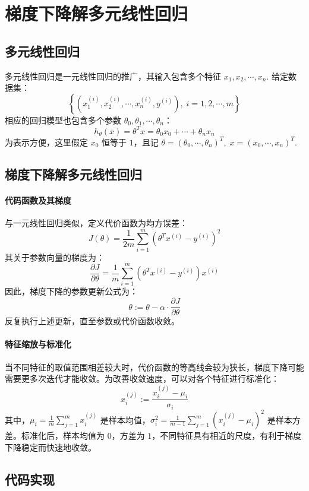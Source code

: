 \section{梯度下降解多元线性回归}
\label{sec:chapter2}

\subsection{多元线性回归}

多元线性回归是一元线性回归的推广，其输入包含多个特征 $x_1,x_2,\cdots,x_n$. 给定数据集：
\[
\left\{\left(x_1^{(i)},x_2^{(i)},\cdots,x_n^{(i)},y^{(i)}\right),\;i=1,2,\cdots,m\right\}
\]
相应的回归模型也包含多个参数 $\theta_0,\theta_1,\cdots,\theta_n$：
\[
h_\theta(x)=\theta^Tx=\theta_0x_0+\cdots+\theta_nx_n
\]
为表示方便，这里假定 $x_0$ 恒等于 $1$，且记 $\theta=(\theta_0,\cdots,\theta_n)^T,\;x=(x_0,\cdots,x_n)^T$.


\subsection{梯度下降解多元线性回归}

\paragraph{代码函数及其梯度}

与一元线性回归类似，定义代价函数为均方误差：
\[
J(\theta)=\frac{1}{2m}\sum_{i=1}^m\left(\theta^Tx^{(i)}-y^{(i)}\right)^2
\]
其关于参数向量的梯度为：
\[
\frac{\partial J}{\partial \theta}=\frac{1}{m}\sum_{i=1}^m\left(\theta^Tx^{(i)}-y^{(i)}\right)x^{(i)}
\]
因此，梯度下降的参数更新公式为：
\[
\theta:=\theta-\alpha\cdot\frac{\partial J}{\partial \theta}
\]
反复执行上述更新，直至参数或代价函数收敛。


\paragraph{特征缩放与标准化}

当不同特征的取值范围相差较大时，代价函数的等高线会较为狭长，梯度下降可能需要更多次迭代才能收敛。为改善收敛速度，可以对各个特征进行标准化：
\[
x_i^{(j)}:=\frac{x_i^{(j)}-\mu_i}{\sigma_i}
\]
其中，$\mu_i=\frac{1}{m}\sum_{j=1}^m x_i^{(j)}$ 是样本均值，$\sigma_i^2=\frac{1}{m-1}\sum_{j=1}^m\left(x_i^{(j)}-\mu_i\right)^2$ 是样本方差。标准化后，样本均值为 $0$，方差为 $1$，不同特征具有相近的尺度，有利于梯度下降稳定而快速地收敛。


\subsection{代码实现}

